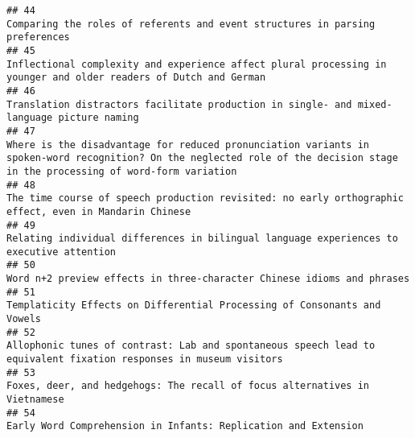 \documentclass[
  english,
  man]{apa6}
\begin{document}
\begin{verbatim}
## 44                                                                                                                                                              Comparing the roles of referents and event structures in parsing preferences
## 45                                                                                                                          Inflectional complexity and experience affect plural processing in younger and older readers of Dutch and German
## 46                                                                                                                                                Translation distractors facilitate production in single- and mixed-language picture naming
## 47                                                             Where is the disadvantage for reduced pronunciation variants in spoken-word recognition? On the neglected role of the decision stage in the processing of word-form variation
## 48                                                                                                                                    The time course of speech production revisited: no early orthographic effect, even in Mandarin Chinese
## 49                                                                                                                                                  Relating individual differences in bilingual language experiences to executive attention
## 50                                                                                                                                                                    Word n+2 preview effects in three-character Chinese idioms and phrases
## 51                                                                                                                                                                  Templaticity Effects on Differential Processing of Consonants and Vowels
## 52                                                                                                                         Allophonic tunes of contrast: Lab and spontaneous speech lead to equivalent fixation responses in museum visitors
## 53                                                                                                                                                                Foxes, deer, and hedgehogs: The recall of focus alternatives in Vietnamese
## 54                                                                                                                                                                            Early Word Comprehension in Infants: Replication and Extension

\end{verbatim}
\end{document}
